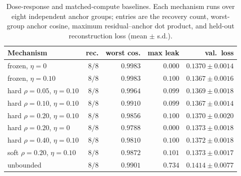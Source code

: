 \documentclass{article}
\theoremstyle{plain}
\begin{document}
{\begin{table}[H]
\caption{Dose-response and matched-compute baselines. Each mechanism runs over eight independent anchor groups; entries are the recovery count, worst-group anchor cosine, maximum residual--anchor dot product, and held-out reconstruction loss (mean $\pm$ s.d.).}
\label{tab:dose_response}
\begin{center}
\scriptsize
\begin{tabular}{@{}lrrrr@{}}
\toprule
Mechanism & rec. & worst cos. & max leak & val.\ loss \\
\midrule
frozen, $\eta=0$ & $8/8$ & $0.9983$ & $0.000$ & $0.1370\pm0.0014$ \\
frozen, $\eta=0.10$ & $8/8$ & $0.9983$ & $0.100$ & $0.1367\pm0.0016$ \\
hard $\rho{=}0.05$, $\eta{=}0.10$ & $8/8$ & $0.9964$ & $0.099$ & $0.1369\pm0.0018$ \\
hard $\rho{=}0.10$, $\eta{=}0.10$ & $8/8$ & $0.9910$ & $0.099$ & $0.1367\pm0.0014$ \\
hard $\rho{=}0.20$, $\eta{=}0.10$ & $8/8$ & $0.9856$ & $0.100$ & $0.1370\pm0.0020$ \\
hard $\rho{=}0.20$, $\eta{=}0$ & $8/8$ & $0.9788$ & $0.000$ & $0.1373\pm0.0018$ \\
hard $\rho{=}0.40$, $\eta{=}0.10$ & $8/8$ & $0.9810$ & $0.100$ & $0.1372\pm0.0018$ \\
soft $\rho{=}0.20$, $\eta{=}0.10$ & $8/8$ & $0.9872$ & $0.101$ & $0.1373\pm0.0017$ \\
unbounded & $8/8$ & $0.9901$ & $0.734$ & $0.1414\pm0.0077$ \\
\bottomrule
\end{tabular}
\end{center}
\end{table}



}
\end{document}
